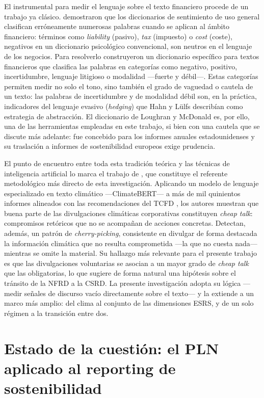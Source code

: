 El instrumental para medir el lenguaje sobre el texto financiero procede de un trabajo ya
clásico. \textcite{loughran2011} demostraron que los diccionarios de sentimiento de uso
general clasifican erróneamente numerosas palabras cuando se aplican al ámbito financiero:
términos como \textit{liability} (pasivo), \textit{tax} (impuesto) o \textit{cost} (coste),
negativos en un diccionario psicológico convencional, son neutros en el lenguaje de los
negocios. Para resolverlo construyeron un diccionario específico para textos financieros que
clasifica las palabras en categorías como negativo, positivo, incertidumbre, lenguaje
litigioso o modalidad —fuerte y débil—. Estas categorías permiten medir no solo el tono, sino
también el grado de vaguedad o cautela de un texto: las palabras de incertidumbre y de
modalidad débil son, en la práctica, indicadores del lenguaje evasivo (\textit{hedging}) que
Hahn y Lülfs describían como estrategia de abstracción. El diccionario de Loughran y McDonald
es, por ello, una de las herramientas empleadas en este trabajo, si bien con una cautela que
se discute más adelante: fue concebido para los informes anuales estadounidenses y su
traslación a informes de sostenibilidad europeos exige prudencia.

El punto de encuentro entre toda esta tradición teórica y las técnicas de inteligencia
artificial lo marca el trabajo de \textcite{bingler2022}, que constituye el referente
metodológico más directo de esta investigación. Aplicando un modelo de lenguaje especializado
en texto climático —ClimateBERT— a más de mil quinientos informes alineados con las
recomendaciones del TCFD \parencite{tcfd2017}, los autores muestran que buena parte de las divulgaciones climáticas
corporativas constituyen \textit{cheap talk}: compromisos retóricos que no se acompañan de
acciones concretas. Detectan, además, un patrón de \textit{cherry-picking}, consistente en
divulgar de forma destacada la información climática que no resulta comprometida —la que no
cuesta nada— mientras se omite la material. Su hallazgo más relevante para el presente trabajo
es que las divulgaciones voluntarias se asocian a un mayor grado de \textit{cheap talk} que las
obligatorias, lo que sugiere de forma natural una hipótesis sobre el tránsito de la NFRD a la
CSRD. La presente investigación adopta su lógica —medir señales de discurso vacío directamente
sobre el texto— y la extiende a un marco más amplio: del clima al conjunto de las
dimensiones ESRS, y de un solo régimen a la transición entre dos.

\section{Estado de la cuestión: el PLN aplicado al reporting de sostenibilidad}
\label{sec:estado}

